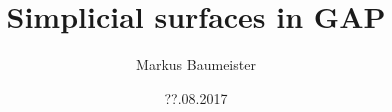 \documentclass[11pt]{beamer}
\author{Markus Baumeister}
\title{Simplicial surfaces in GAP}
\date{??.08.2017}
\theoremstyle{remark}
\begin{document}
\begin{frame}
\titlepage
\end{frame}
\end{document}
